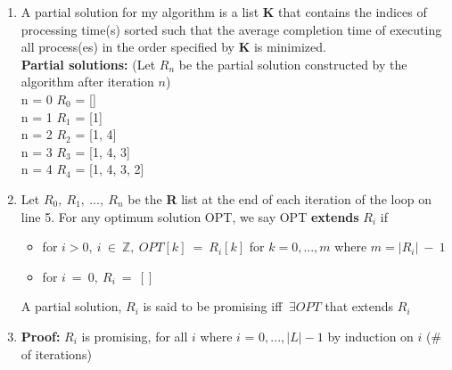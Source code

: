 \documentclass[11pt,twoside]{article}
\begin{document}
\begin{enumerate}[leftmargin=0pt,label=(\alph*)]
\begin{enumerate}[leftmargin=10pt,label=\arabic*]
    \item\hspace{2mm} \hspace{5mm} \hspace{5mm} \hspace{5mm} {\bf break} \hspace{18mm}{\scshape //this occurrence in L}
    \item\hspace{2mm}{\bf return} R 

    \end{enumerate}
\item A partial solution for my algorithm is a list {\bf K} that contains the indices of processing time(s) sorted such that the average completion time of executing all process(es) in the order specified by {\bf K} is minimized.\\
{\bf Partial solutions:} (Let $R_{n}$ be the partial solution constructed by the algorithm after iteration $n$) \\
n = 0 \hspace{5mm} $R_{0}$ = []\\
n = 1 \hspace{5mm} $R_{1}$ = [1]\\
n = 2 \hspace{5mm} $R_{2}$ = [1, 4]\\
n = 3 \hspace{5mm} $R_{3}$ = [1, 4, 3]\\
n = 4 \hspace{5mm} $R_{4}$ = [1, 4, 3, 2]\\

\item Let $R_{0},\ R_{1},\ ...,\ R_{n}$ be the {\bf R} list at the end of each iteration of the loop on line 5. For any optimum solution OPT, we say OPT {\bf extends} $R_{i}$ if
    \begin{itemize}
    \item for $i>0,\ i\ \in\ \mathbb{Z},\ OPT[k]\ =\ R_{i}[k]$ for $k=0,...,m$ where $m=|R_{i}|\ -\ 1$
    \item for $i\ =\ 0,\ R_{i}\ =\ []$
    \end{itemize}
A partial solution, $R_{i}$ is said to be promising iff $\ \exists OPT$ that extends $R_{i}$

\item {\bf Proof:} $R_{i}$ is promising, for all $i$ where $i$ = $0,...,|L|-1$ by induction on $i$ (\# of iterations)


\end{enumerate}
\end{document}
